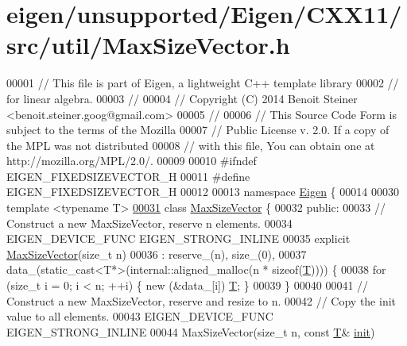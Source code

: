 \hypertarget{eigen_2unsupported_2_eigen_2_c_x_x11_2src_2util_2_max_size_vector_8h_source}{}\section{eigen/unsupported/\+Eigen/\+C\+X\+X11/src/util/\+Max\+Size\+Vector.h}
\label{eigen_2unsupported_2_eigen_2_c_x_x11_2src_2util_2_max_size_vector_8h_source}

\begin{DoxyCode}
00001 \textcolor{comment}{// This file is part of Eigen, a lightweight C++ template library}
00002 \textcolor{comment}{// for linear algebra.}
00003 \textcolor{comment}{//}
00004 \textcolor{comment}{// Copyright (C) 2014 Benoit Steiner <benoit.steiner.goog@gmail.com>}
00005 \textcolor{comment}{//}
00006 \textcolor{comment}{// This Source Code Form is subject to the terms of the Mozilla}
00007 \textcolor{comment}{// Public License v. 2.0. If a copy of the MPL was not distributed}
00008 \textcolor{comment}{// with this file, You can obtain one at http://mozilla.org/MPL/2.0/.}
00009 
00010 \textcolor{preprocessor}{#ifndef EIGEN\_FIXEDSIZEVECTOR\_H}
00011 \textcolor{preprocessor}{#define EIGEN\_FIXEDSIZEVECTOR\_H}
00012 
00013 \textcolor{keyword}{namespace }\hyperlink{namespace_eigen}{Eigen} \{
00014 
00030 \textcolor{keyword}{template} <\textcolor{keyword}{typename} T>
\hyperlink{class_eigen_1_1_max_size_vector}{00031} \textcolor{keyword}{class }\hyperlink{class_eigen_1_1_max_size_vector}{MaxSizeVector} \{
00032  \textcolor{keyword}{public}:
00033   \textcolor{comment}{// Construct a new MaxSizeVector, reserve n elements.}
00034   EIGEN\_DEVICE\_FUNC EIGEN\_STRONG\_INLINE
00035   \textcolor{keyword}{explicit} \hyperlink{class_eigen_1_1_max_size_vector}{MaxSizeVector}(\textcolor{keywordtype}{size\_t} n)
00036       : reserve\_(n), size\_(0),
00037         data\_(static\_cast<T*>(internal::aligned\_malloc(n * \textcolor{keyword}{sizeof}(\hyperlink{group___sparse_core___module}{T})))) \{
00038     \textcolor{keywordflow}{for} (\textcolor{keywordtype}{size\_t} i = 0; i < n; ++i) \{ \textcolor{keyword}{new} (&data\_[i]) \hyperlink{group___sparse_core___module}{T}; \}
00039   \}
00040 
00041   \textcolor{comment}{// Construct a new MaxSizeVector, reserve and resize to n.}
00042   \textcolor{comment}{// Copy the init value to all elements.}
00043   EIGEN\_DEVICE\_FUNC EIGEN\_STRONG\_INLINE
00044   MaxSizeVector(\textcolor{keywordtype}{size\_t} n, \textcolor{keyword}{const} \hyperlink{group___sparse_core___module}{T}& \hyperlink{structinit}{init})

\end{DoxyCode}
